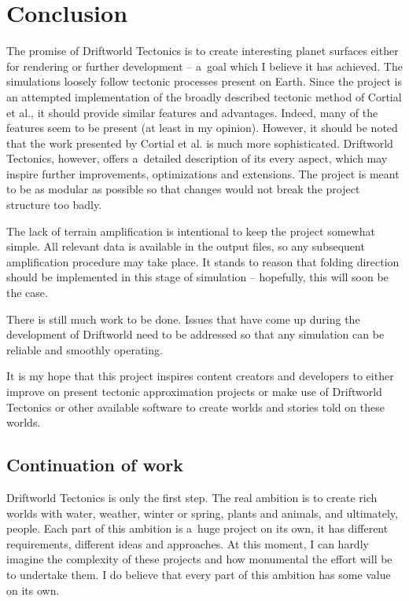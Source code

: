 \section{Conclusion}
\label{sec:conclusion}
The promise of Driftworld Tectonics is to create interesting planet surfaces either for rendering or further development -- a~goal which I believe it has achieved. The simulations loosely follow tectonic processes present on Earth. Since the project is an attempted implementation of the broadly described tectonic method of Cortial et al., it should provide similar features and advantages. Indeed, many of the features seem to be present (at least in my opinion). However, it should be noted that the work presented by Cortial et al. is much more sophisticated. Driftworld Tectonics, however, offers a~detailed description of its every aspect, which may inspire further improvements, optimizations and extensions. The project is meant to be as modular as possible so that changes would not break the project structure too badly.

The lack of terrain amplification is intentional to keep the project somewhat simple. All relevant data is available in the output files, so any subsequent amplification procedure may take place. It stands to reason that folding direction should be implemented in this stage of simulation -- hopefully, this will soon be the case.

There is still much work to be done. Issues that have come up during the development of Driftworld need to be addressed so that any simulation can be reliable and smoothly operating.

It is my hope that this project inspires content creators and developers to either improve on present tectonic approximation projects or make use of Driftworld Tectonics or other available software to create worlds and stories told on these worlds.
\subsection{Continuation of work}
Driftworld Tectonics is only the first step. The real ambition is to create rich worlds with water, weather, winter or spring, plants and animals, and ultimately, people. Each part of this ambition is a~huge project on its own, it has different requirements, different ideas and approaches. At this moment, I can hardly imagine the complexity of these projects and how monumental the effort will be to undertake them. I do believe that every part of this ambition has some value on its own.

